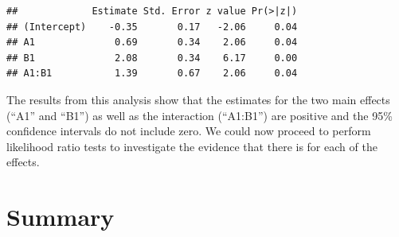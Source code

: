 \documentclass[
  12pt,
]{krantz}
\newenvironment{Shaded}{\begin{snugshade}}{\end{snugshade}}
\newcommand{\AttributeTok}[1]{\textcolor[rgb]{0.77,0.63,0.00}{#1}}
\newcommand{\CommentTok}[1]{\textcolor[rgb]{0.56,0.35,0.01}{\textit{#1}}}
\newcommand{\DecValTok}[1]{\textcolor[rgb]{0.00,0.00,0.81}{#1}}
\newcommand{\FloatTok}[1]{\textcolor[rgb]{0.00,0.00,0.81}{#1}}
\newcommand{\FunctionTok}[1]{\textcolor[rgb]{0.00,0.00,0.00}{#1}}
\newcommand{\NormalTok}[1]{#1}
\newcommand{\OtherTok}[1]{\textcolor[rgb]{0.56,0.35,0.01}{#1}}
\newcommand{\SpecialCharTok}[1]{\textcolor[rgb]{0.00,0.00,0.00}{#1}}
\newcommand{\StringTok}[1]{\textcolor[rgb]{0.31,0.60,0.02}{#1}}
\theoremstyle{definition}
\theoremstyle{definition}
\theoremstyle{definition}
\theoremstyle{definition}
\theoremstyle{remark}
\begin{document}
\begin{Shaded}
\end{Shaded}

\begin{Shaded}
\end{Shaded}

\begin{verbatim}
##             Estimate Std. Error z value Pr(>|z|)
## (Intercept)    -0.35       0.17   -2.06     0.04
## A1              0.69       0.34    2.06     0.04
## B1              2.08       0.34    6.17     0.00
## A1:B1           1.39       0.67    2.06     0.04
\end{verbatim}

The results from this analysis show that the estimates for the two main effects (``A1'' and ``B1'') as well as the interaction (``A1:B1'') are positive and the 95\% confidence intervals do not include zero. We could now proceed to perform likelihood ratio tests to investigate the evidence that there is for each of the effects.

\hypertarget{summary-6}{%
\section{Summary}\label{summary-6}}
\end{document}
